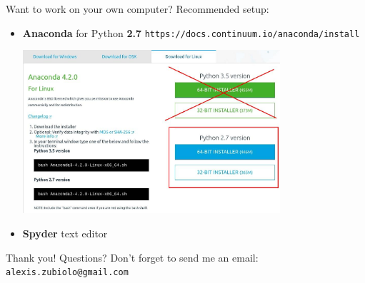 \documentclass{beamer}
\begin{document}
\begin{frame}{Want to work on your own computer?}
\vfill
Recommended setup:
\vfill
\begin{itemize}
	\item \textbf{Anaconda} for Python \textbf{2.7}
	\newline \texttt{https://docs.continuum.io/anaconda/install}
\begin{center}
\includegraphics[width=0.75\textwidth]{images/anaconda_download.jpg}
\end{center}
	\item \textbf{Spyder} text editor
\end{itemize}
\vfill
\end{frame}

\begin{frame}
\vfill
\centering
\huge{Thank you! Questions?}
\vfill
Don't forget to send me an email: \texttt{alexis.zubiolo@gmail.com}
\vfill
\end{frame}
\end{document}
